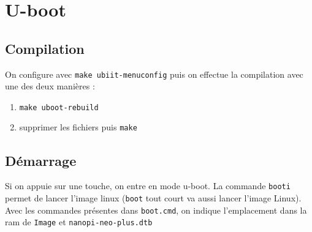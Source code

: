\documentclass[resume]{subfiles}
\begin{document}
\section{U-boot}
\subsection{Compilation}
On configure avec \verb!make ubiit-menuconfig! puis on effectue la compilation avec une des deux manières :
\begin{enumerate}
\item \verb!make uboot-rebuild!
\item supprimer les fichiers puis \verb!make!
\end{enumerate}
\subsection{Démarrage}
Si on appuie sur une touche, on entre en mode u-boot. La commande \verb!booti! permet de lancer l'image linux (\verb!boot! tout court va aussi lancer l'image Linux).\\
Avec les commandes présentes dans \verb!boot.cmd!, on indique l'emplacement dans la ram de \verb!Image! et \verb!nanopi-neo-plus.dtb!
\end{document}
